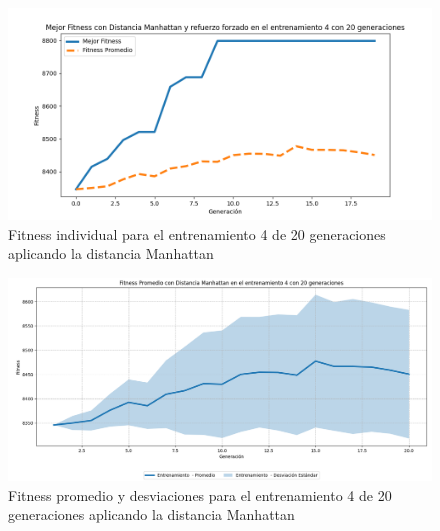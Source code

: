 \documentclass[conference]{IEEEtran}
\begin{document}
\begin{figure}[H]
    \centering
    \includegraphics[width=0.9 \linewidth]{Manhattan/Fitness_individual_20Gen/Fitness_4_Manh_20Gen.png}
    \caption{Fitness individual para el entrenamiento 4 de 20 generaciones aplicando la distancia Manhattan}
    \label{fig:manhattan_4_20}
\end{figure}
\begin{figure}[H]
    \centering
    \includegraphics[width=0.9 \linewidth]{Manhattan/Fitness_individual_20Gen/Fitness_4_Manh_20Gen_Sombra.png}
    \caption{Fitness promedio y desviaciones para el entrenamiento 4 de 20 generaciones aplicando la distancia Manhattan}
    \label{fig:manhattan_4_20_sombra}
\end{figure}
\end{document}
